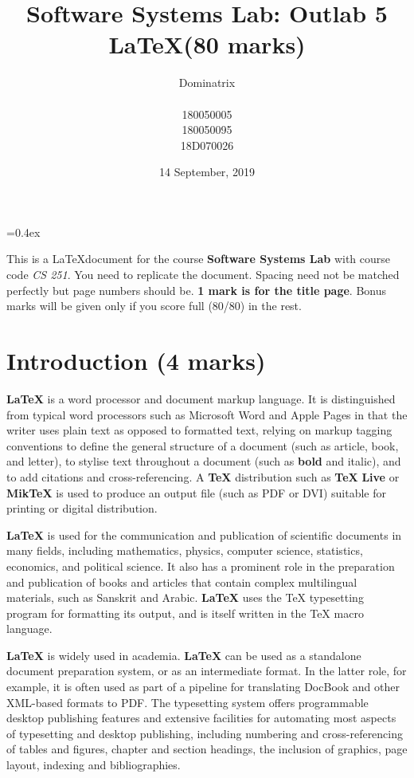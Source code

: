 \documentclass[12pt]{article}
\title{\vspace*{55mm}\Huge\textbf{Software Systems Lab: Outlab 5} \\ \textbf{\LaTeX (80 marks)}}
\author{\huge Dominatrix \\ \\ \large 180050005 \\ 180050095 \\ 18D070026}
\date{14 September, 2019}
\newcommand{\LATEX}{\LaTeX}
\begin{document}
\font=0.4ex

\begin{titlingpage}
	\maketitle
\end{titlingpage}
\newpage
\tableofcontents


\newpage

 This is a \LaTeX document for the course \textbf{Software Systems Lab} with course code \textit{CS 251}. You need to replicate the document. Spacing need not be matched perfectly but page numbers should be. \textbf{1 mark is for the title page}. Bonus marks will be given only if you score full (80/80) in the rest.

 
\section{ Introduction (4 marks) }%
\indent

\textbf{\LaTeX} is a word processor and document markup language. It is distinguished from typical word processors such as Microsoft Word and Apple Pages in that the writer uses plain text as opposed to formatted text, relying on markup tagging conventions to define the general structure of a document (such as article, book, and letter), to stylise text throughout a document (such as \textbf{bold} and italic), and to add citations and cross-referencing. A \textbf{\TeX} distribution such as \textbf{\TeX} \textbf{Live} or \textbf{MikTeX} is used to produce an output file (such as PDF or DVI)
suitable for printing or digital distribution.
\newline

 
\textbf{\LaTeX} is used for the communication and publication of scientific documents
in many fields, including mathematics, physics, computer science, statistics,
economics, and political science. It also has a prominent role in the preparation
and publication of books and articles that contain complex multilingual materials, such as Sanskrit and Arabic. \textbf{\LATEX} uses the TeX typesetting program for
formatting its output, and is itself written in the TeX macro language.
\newline


\textbf{\LaTeX} is widely used in academia. \textbf{\LaTeX} can be used as a standalone document preparation system, or as an intermediate format. In the latter role, for
example, it is often used as part of a pipeline for translating DocBook and other
XML-based formats to PDF. The typesetting system offers programmable desktop publishing features and extensive facilities for automating most aspects of
typesetting and desktop publishing, including numbering and cross-referencing
of tables and figures, chapter and section headings, the inclusion of graphics,
page layout, indexing and bibliographies.\newline
\par
\end{document}
